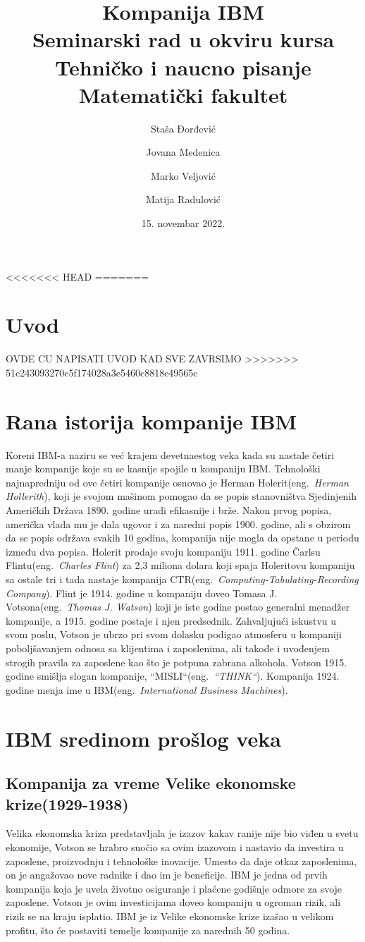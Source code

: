 \documentclass[a4paper]{article}
\title{Kompanija IBM \\
\normalsize Seminarski rad u okviru kursa\\ Tehničko i naucno pisanje
\\Matematički fakultet}
\author{Staša Đorđević \and
Jovana Medenica \and
Marko Veljović \and
Matija Radulović} %
\date{15. novembar 2022.} %
\begin{document}
<<<<<<< HEAD
=======
\maketitle
\tableofcontents
\section{Uvod}
OVDE CU NAPISATI UVOD KAD SVE ZAVRSIMO %
>>>>>>> 51c243093270c5f174028a3e5460c8818e49565c
\section{Rana istorija kompanije IBM}
Koreni IBM-a naziru se već krajem devetnaestog veka kada su nastale četiri manje kompanije koje su se kasnije spojile u kompaniju IBM. Tehnološki najnapredniju od ove četiri kompanije osnovao je Herman Holerit(eng.~{\em Herman Hollerith}), koji je svojom mašinom pomogao da se popis stanovništva Sjedinjenih Američkih Država 1890. godine uradi efikasnije i brže. Nakon prvog popisa, američka vlada mu je dala ugovor i za naredni popis 1900. godine, ali s obzirom da se popis održava svakih 10 godina, kompanija nije mogla da opstane u periodu između dva popisa. Holerit prodaje svoju kompaniju 1911. godine Čarlsu Flintu(eng.~{\em Charles Flint}) za 2,3 miliona dolara koji spaja Holeritovu kompaniju sa ostale tri i tada nastaje kompanija CTR(eng.~{\em Computing-Tabulating-Recording Company}). Flint je 1914. godine u kompaniju doveo Tomasa J. Votsona(eng.~{\em Thomas J. Watson}) koji je iste godine postao generalni menadžer kompanije, a 1915. godine postaje i njen predsednik. Zahvaljujući iskustvu u svom poslu, Votson je ubrzo pri svom dolasku podigao atmosferu u kompaniji poboljšavanjem odnosa sa klijentima i zaposlenima, ali takođe i uvođenjem strogih pravila za zaposlene kao što je potpuna zabrana alkohola. Votson 1915. godine smišlja slogan kompanije, ``MISLI``(eng.~{\em ``THINK``}). Kompanija 1924. godine menja ime u IBM(eng.~{\em International Business Machines}).

\section{IBM sredinom prošlog veka}
\subsection{Kompanija za vreme Velike ekonomske krize(1929-1938)}
Velika ekonomska kriza predstavljala je izazov kakav ranije nije bio viđen u svetu ekonomije, Votson se hrabro suočio sa ovim izazovom i nastavio da investira u zaposlene, proizvodnju i tehnološke inovacije. Umesto da daje otkaz zaposlenima, on je angažovao nove radnike i dao im je beneficije. IBM je jedna od prvih kompanija koja je uvela životno osiguranje i plaćene godišnje odmore za svoje zaposlene. Votson je ovim investicijama doveo kompaniju u ogroman rizik, ali rizik se na kraju isplatio. IBM je iz Velike ekonomske krize izašao u velikom profitu, što će postaviti temelje kompanije za narednih 50 godina.
\end{document}
